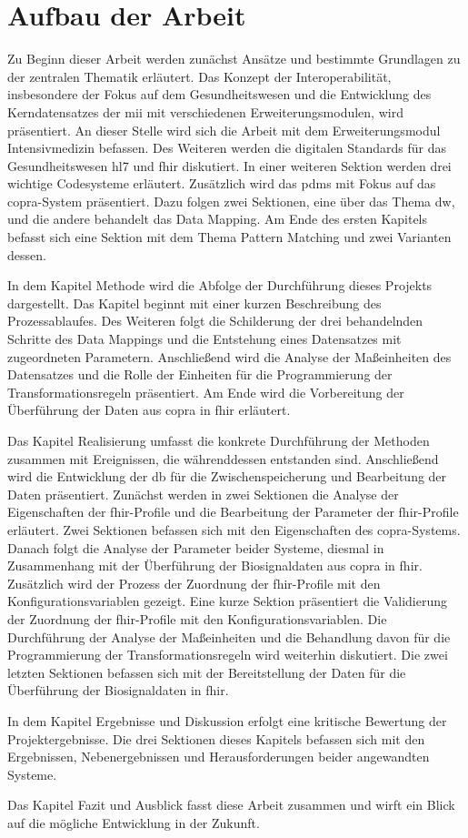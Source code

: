 \section{Aufbau der Arbeit} \label{sec:structure}

Zu Beginn dieser Arbeit werden zunächst Ansätze und bestimmte Grundlagen zu der zentralen Thematik erläutert. Das Konzept der Interoperabilität, insbesondere der Fokus auf dem Gesundheitswesen und die Entwicklung des Kerndatensatzes der \ac{mii} mit verschiedenen Erweiterungsmodulen, wird präsentiert. An dieser Stelle wird sich die Arbeit mit dem Erweiterungsmodul Intensivmedizin befassen. Des Weiteren werden die digitalen Standards für das Gesundheitswesen \ac{hl7} und \ac{fhir} diskutiert. In einer weiteren Sektion werden drei wichtige Codesysteme erläutert. Zusätzlich wird das \ac{pdms} mit Fokus auf das \ac{copra}-System präsentiert. Dazu folgen zwei Sektionen, eine über das Thema \ac{dw}, und die andere behandelt das Data Mapping. Am Ende des ersten Kapitels befasst sich eine Sektion mit dem Thema Pattern Matching und zwei Varianten dessen.

In dem Kapitel \glqq Methode\grqq{} wird die Abfolge der Durchführung dieses Projekts dargestellt. Das Kapitel beginnt mit einer kurzen Beschreibung des Prozessablaufes. Des Weiteren folgt die Schilderung der drei behandelnden Schritte des Data Mappings und die Entstehung eines Datensatzes mit zugeordneten Parametern. Anschließend wird die Analyse der Maßeinheiten des Datensatzes und die Rolle der Einheiten für die Programmierung der Transformationsregeln präsentiert. Am Ende wird die Vorbereitung der Überführung der Daten aus \ac{copra} in \ac{fhir} erläutert.

Das Kapitel \glqq Realisierung\grqq{} umfasst die konkrete Durchführung der Methoden zusammen mit Ereignissen, die währenddessen entstanden sind. Anschließend wird die Entwicklung der \ac{db} für die Zwischenspeicherung und Bearbeitung der Daten präsentiert. Zunächst werden in zwei Sektionen die Analyse der Eigenschaften der \ac{fhir}-Profile und die Bearbeitung der Parameter der \ac{fhir}-Profile erläutert. Zwei Sektionen befassen sich mit den Eigenschaften des \ac{copra}-Systems. Danach folgt die Analyse der Parameter beider Systeme, diesmal in Zusammenhang mit der Überführung der Biosignaldaten aus \ac{copra} in \ac{fhir}. Zusätzlich wird der Prozess der Zuordnung der \ac{fhir}-Profile mit den Konfigurationsvariablen gezeigt. Eine kurze Sektion präsentiert die Validierung der Zuordnung der \ac{fhir}-Profile mit den Konfigurationsvariablen. Die Durchführung der Analyse der Maßeinheiten und die Behandlung davon für die Programmierung der Transformationsregeln wird weiterhin diskutiert. Die zwei letzten Sektionen befassen sich mit der Bereitstellung der Daten für die Überführung der Biosignaldaten in \ac{fhir}.

In dem Kapitel \glqq Ergebnisse und Diskussion\grqq{} erfolgt eine kritische Bewertung der Projektergebnisse. Die drei Sektionen dieses Kapitels befassen sich mit den Ergebnissen, Nebenergebnissen und Herausforderungen beider angewandten Systeme.

Das Kapitel \glqq Fazit und Ausblick\grqq{} fasst diese Arbeit zusammen und wirft ein Blick auf die mögliche Entwicklung in der Zukunft.